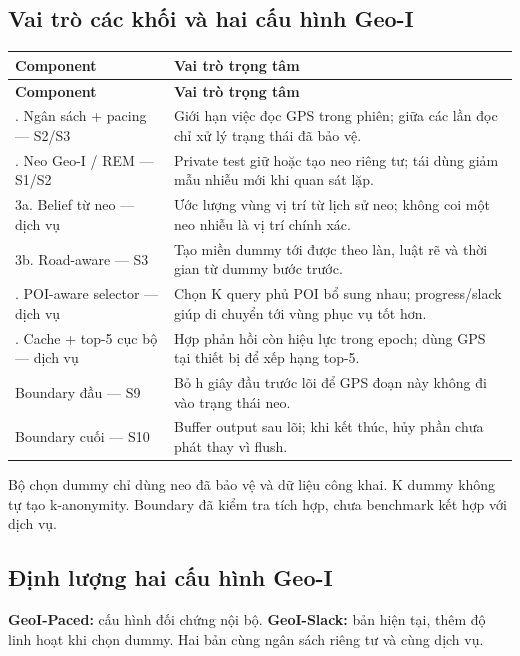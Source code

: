 \documentclass[10pt,a4paper]{article}
\begin{document}
\subsection{Vai trò các khối và hai cấu hình Geo-I}\label{sub:2.1}
\begingroup\small
\begin{longtable}{@{}P{5.006cm}P{11.913cm}@{}}
\toprule
\textbf{Component} & \textbf{Vai trò trọng tâm}\\\midrule
\endfirsthead
\toprule
\textbf{Component} & \textbf{Vai trò trọng tâm}\\\midrule
\endhead
\bottomrule{}. Ngân sách + pacing — S2/S3 & Giới hạn việc đọc GPS trong phiên; giữa các lần đọc chỉ xử lý trạng thái đã bảo vệ.\\
. Neo Geo-I / REM — S1/S2 & Private test giữ hoặc tạo neo riêng tư; tái dùng giảm mẫu nhiễu mới khi quan sát lặp.\\
\addlinespace[3pt]
3a. Belief từ neo — dịch vụ & Ước lượng vùng vị trí từ lịch sử neo; không coi một neo nhiễu là vị trí chính xác.\\
\addlinespace[3pt]
3b. Road-aware — S3 & Tạo miền dummy tới được theo làn, luật rẽ và thời gian từ dummy bước trước.\\
. POI-aware selector — dịch vụ & Chọn K query phủ POI bổ sung nhau; progress/slack giúp di chuyển tới vùng phục vụ tốt hơn.\\
. Cache + top-5 cục bộ — dịch vụ & Hợp phản hồi còn hiệu lực trong epoch; dùng GPS tại thiết bị để xếp hạng top-5.\\
\addlinespace[3pt]
Boundary đầu — S9 & Bỏ h giây đầu trước lõi để GPS đoạn này không đi vào trạng thái neo.\\
\addlinespace[3pt]
Boundary cuối — S10 & Buffer output sau lõi; khi kết thúc, hủy phần chưa phát thay vì flush.\\
\end{longtable}
\endgroup
Bộ chọn dummy chỉ dùng neo đã bảo vệ và dữ liệu công khai. K dummy không tự tạo k-anonymity. Boundary đã kiểm tra tích hợp, chưa benchmark kết hợp với dịch vụ.

\subsection{Định lượng hai cấu hình Geo-I}\label{sub:2.2}
\textbf{GeoI-Paced:} cấu hình đối chứng nội bộ. \textbf{GeoI-Slack:} bản hiện tại, thêm độ linh hoạt khi chọn dummy. Hai bản cùng ngân sách riêng tư và cùng dịch vụ.
\end{document}
